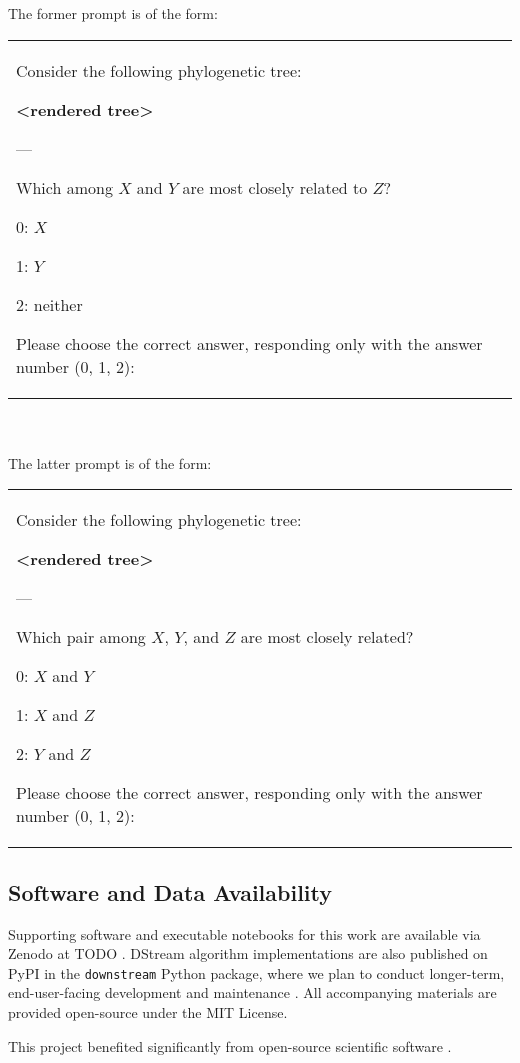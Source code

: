 The former prompt is of the form:

\begin{tabular}{|p{}}
Consider the following phylogenetic tree:

\textbf{<rendered tree>}

---

Which among $X$ and $Y$ are most closely related to $Z$?

0: $X$

1: $Y$

2: neither

Please choose the correct answer, responding only with the answer number (0, 1, 2):
\end{tabular}

~\\
~\\
The latter prompt is of the form:

\begin{tabular}{|p{}}
Consider the following phylogenetic tree:

\textbf{<rendered tree>}

---

Which pair among $X$, $Y$, and $Z$ are most closely related?

0: $X$ and $Y$

1: $X$ and $Z$

2: $Y$ and $Z$

Please choose the correct answer, responding only with the answer number (0, 1, 2):
\end{tabular}

\subsection{Software and Data Availability} \label{sec:materials}

Supporting software and executable notebooks for this work are available via Zenodo at TODO \citep{moreno2024hsurf}.
DStream algorithm implementations are also published on PyPI in the \texttt{downstream} Python package, where we plan to conduct longer-term, end-user-facing development and maintenance \citep{moreno2024downstream}.
All accompanying materials are provided open-source under the MIT License.

This project benefited significantly from open-source scientific software \citep{2020SciPy-NMeth,harris2020array,reback2020pandas,mckinney-proc-scipy-2010,waskom2021seaborn,hunter2007matplotlib,moreno2023teeplot}.
